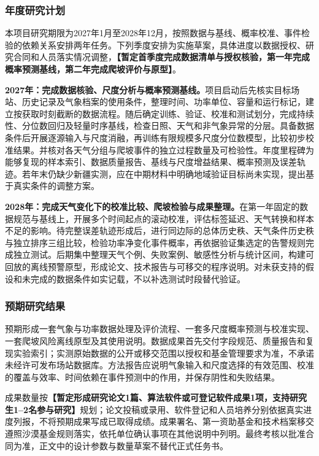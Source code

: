 \justifying
\NSFCBodyText

\subsubsection{年度研究计划}
本项目研究期限为2027年1月至2028年12月，按照数据与基线、概率校准、事件检验的依赖关系安排两年任务。下列季度安排为实施草案，具体进度以数据授权、研究合同和人员落实情况调整，\textbf{【暂定首季度完成数据清单与授权核验，第一年完成概率预测基线，第二年完成爬坡评价与原型】}。

\textbf{2027年：完成数据核验、尺度分析与概率预测基线。}项目启动后先核实目标场站、历史记录及气象档案的使用条件，整理时间、功率单位、容量和运行标记，建立按获取时刻截断的数据流程。随后确定训练、验证、校准和测试划分，完成持续性、分位数回归及轻量时序基线，检查日照、天气和非气象异常的分层。具备数据条件后开展逐源输入与尺度消融，再训练有限规模多尺度分位数模型，比较初步校准结果。并核对各天气分组与爬坡事件的独立过程数量及可检验性。年度里程碑为能够复现的样本索引、数据质量报告、基线与尺度增益结果、概率预测及误差轨迹。若年末仍缺少新疆实测，应在中期材料中明确地域验证目标尚未实现，提出基于真实条件的调整方案。

\textbf{2028年：完成天气变化下的校准比较、爬坡检验与成果整理。}在第一年固定的数据规范与基线上，开展多个时间起点的滚动校准，评估标签延迟、天气转换和样本不足的影响。待完整误差轨迹形成后，进行同边际的总体历史秩、天气条件历史秩与独立排序三组比较，检验功率净变化事件概率，再依据验证集选定的告警规则完成独立测试。后期集中整理天气个例、失败案例、敏感性分析与统计区间，构建可回放的离线预警原型，形成论文、技术报告与可移交的程序说明。对未获支持的假设和未完成的数据条件如实记载，不以补选测试时段替代验证。

\subsubsection{预期研究结果}
预期形成一套气象与功率数据处理及评价流程、一套多尺度概率预测与校准实现、一套爬坡风险离线原型及其使用说明。数据成果首先交付字段规范、质量报告和复现实验索引；实测原始数据的公开或移交范围以授权和基金管理要求为准，不承诺未经许可发布场站数据库。方法报告应说明气象输入和尺度选择的有效范围、校准的覆盖与效率、时间依赖在事件预测中的作用，并保存阴性和失败结果。

成果数量按\textbf{【暂定形成研究论文1篇、算法软件或可登记软件成果1项，支持研究生1--2名参与研究】}规划；论文投稿或录用、软件登记和人员培养分别依据真实进度列报，不将预期成果写成已取得成绩。成果署名、第一资助基金和技术档案移交遵照沙漠基金规则落实，依托单位确认事项在其他说明中列明。最终考核以批准合同为准，正文中的设计参数与数量草案不替代正式任务书。
